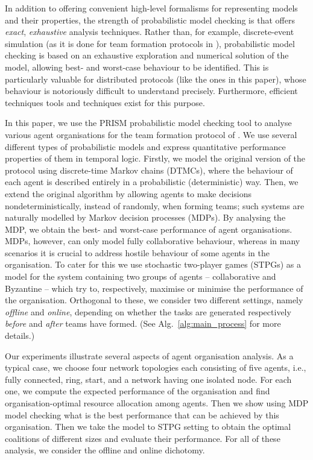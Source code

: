 \documentclass{llncs}
\newcommand{\dave}[1]{\marginpar{\footnotesize \color{red} {\bf D:} \textsf{#1}}}
\begin{document}
In addition to offering convenient high-level formalisms for representing models and their properties,
the strength of probabilistic model checking is that offers \emph{exact}, \emph{exhaustive} analysis techniques.
Rather than, for example, discrete-event simulation
(as it is done for team formation protocols in \cite{gaston2005agent}),
probabilistic model checking is based on an exhaustive exploration and numerical solution of the model,
allowing best- and worst-case behaviour to be identified.
This is particularly valuable for distributed protocols (like the ones in this paper),
whose behaviour is notoriously difficult to understand precisely. %
Furthermore, efficient techniques tools and techniques exist for this purpose.

In this paper, we use the PRISM probabilistic model checking tool \cite{KNP11} to analyse various agent organisations for the team formation protocol of \cite{gaston2005agent}.
We use several different types of probabilistic models
and express quantitative performance properties of them in temporal logic.
Firstly, we model the original version of the protocol using discrete-time Markov chains (DTMCs), where the behaviour of each agent is described entirely in a probabilistic (deterministic) way. Then, we extend the original algorithm  by allowing agents to make decisions nondeterministically, instead of randomly, when forming teams; such systems are naturally modelled by Markov decision processes (MDPs). By analysing the MDP, we obtain the best- and worst-case performance of agent organisations.
MDPs, however, can only model fully collaborative behaviour, whereas in many scenarios it is crucial to address hostile behaviour of some agents in the organisation. To cater for this we use stochastic two-player games (STPGs) as a model for the system containing two groups of agents -- collaborative and Byzantine -- which try to, respectively, maximise or minimise the performance of the organisation. Orthogonal to these, we consider two different settings, namely \emph{offline} and \emph{online}, depending on whether the tasks are generated respectively \emph{before} and \emph{after} teams have formed. (See Alg.~\ref{alg:main_process} for more details.)


Our experiments illustrate several aspects of agent organisation analysis. As a typical case, we choose four network topologies each consisting of five agents, i.e., fully connected, ring, start, and a network having one isolated node. For each one, we compute the expected performance of the organisation and find organisation-optimal resource allocation among agents. Then we show using MDP model checking what is the best performance that can be achieved by this organisation. Then we take the model to STPG setting to obtain the optimal coalitions of different sizes and evaluate their performance. For all of these analysis, we consider the offline and online dichotomy.
\end{document}
